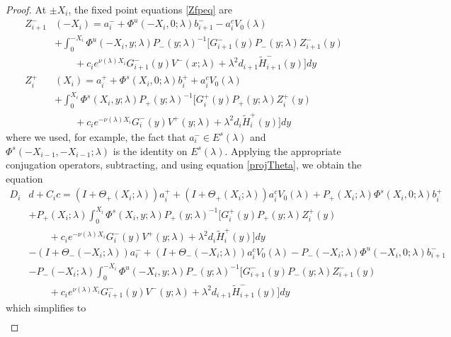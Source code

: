 \documentclass[thesis.tex]{subfiles}
\begin{document}
\begin{lemma}
\begin{proof}
At $\pm X_i$, the fixed point equations \eqref{Zfpeq} are
\begin{align*}
Z_{i+1}^-&(-X_i) = a_i^- + \Phi^u(-X_i, 0; \lambda) b_{i+1}^- - a_i^c V_0(\lambda) \\ 
&+ \int_0^{-X_i} \Phi^u(-X_i, y; \lambda) P_-(y; \lambda)^{-1} \big[ G_{i+1}^-(y) P_-(y; \lambda)Z_{i+1}^-(y) \\
&\qquad+ c_i e^{\nu(\lambda)X_i} G_{i+1}^-(y) V^-(x; \lambda) + \lambda^2 d_{i+1} \tilde{H}_{i+1}^-(y)\big] dy \\
Z_i^+&(X_i) = a_i^+ + \Phi^s(X_i, 0; \lambda) b_i^+ + a_i^c V_0(\lambda) \\
&+ \int_0^{X_i} \Phi^s(X_i, y; \lambda) P_+(y; \lambda)^{-1} \big[ G_i^+(y) P_+(y; \lambda) Z_i^+(y) \\
&\qquad+ c_i e^{-\nu(\lambda)X_i} G_i^-(y) V^+(y; \lambda) + \lambda^2 d_i \tilde{H}_i^+(y)\big] dy
\end{align*}
where we used, for example, the fact that $a_i^- \in E^s(\lambda)$ and $\Phi^s(-X_{i-1}, -X_{i-1}; \lambda)$ is the identity on $E^s(\lambda)$. Applying the appropriate conjugation operators, subtracting, and using equation \eqref{projTheta}, we obtain the equation 
\begin{equation}\label{Dideq0}
\begin{aligned}
D_i &d + C_i c = (I + \Theta_+(X_i; \lambda))a_i^+ + (I + \Theta_+(X_i; \lambda))a_i^c V_0(\lambda) + P_+(X_i; \lambda)\Phi^s(X_i, 0; \lambda) b_i^+ \\
&+ P_+(X_i; \lambda) \int_0^{X_i} \Phi^s(X_i, y; \lambda) P_+(y; \lambda)^{-1}\big[ G_i^+(y) P_+(y; \lambda) Z_i^+(y) \\
&\qquad+ c_i e^{-\nu(\lambda)X_i} G_i^-(y) V^+(y; \lambda) + \lambda^2 d_i \tilde{H}_i^+(y)\big] dy \\
&- (I + \Theta_-(-X_i; \lambda))a_i^- + (I + \Theta_-(-X_i; \lambda))a_i^c V_0(\lambda) - P_-(-X_i; \lambda)\Phi^u(-X_i, 0; \lambda) b_{i+1}^- \\ 
&- P_-(-X_i; \lambda) \int_0^{-X_i} \Phi^u(-X_i, y; \lambda) P_-(y; \lambda)^{-1}\big[ G_{i+1}^-(y) P_-(y; \lambda)Z_{i+1}^-(y) \\
&\qquad+ c_i e^{\nu(\lambda)X_i} G_{i+1}^-(y) V^-(y; \lambda) + \lambda^2 d_{i+1} \tilde{H}_{i+1}^-(y)\big] dy
\end{aligned}
\end{equation}
which simplifies to
\begin{equation}\label{Didexpansion}
\begin{aligned}

\end{aligned}
\end{equation}
\end{proof}
\end{lemma}
\end{document}
